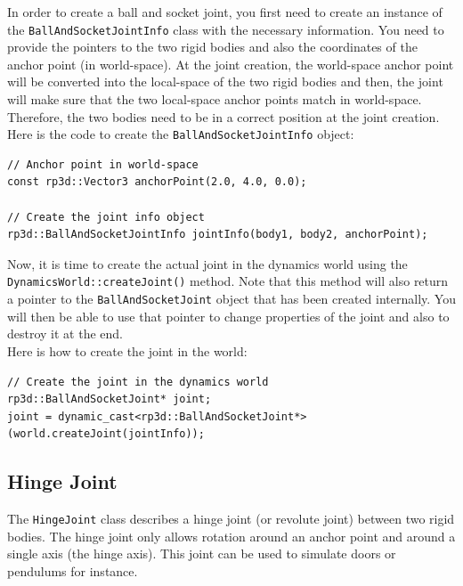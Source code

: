 \documentclass[a4paper,12pt]{article}
\begin{document}
    In order to create a ball and socket joint, you first need to create an instance of the \texttt{BallAndSocketJointInfo} class with the necessary information. You need to provide the pointers to the
    two rigid bodies and also the coordinates of the anchor point (in world-space). At the joint creation, the world-space anchor point will be converted into the local-space of the two rigid
    bodies and then, the joint will make sure that the two local-space anchor points match in world-space. Therefore, the two bodies need to be in a correct position at the joint creation. \\

    Here is the code to create the \texttt{BallAndSocketJointInfo} object: \\

    \begin{lstlisting}
// Anchor point in world-space
const rp3d::Vector3 anchorPoint(2.0, 4.0, 0.0);

// Create the joint info object
rp3d::BallAndSocketJointInfo jointInfo(body1, body2, anchorPoint);
  \end{lstlisting}

    \vspace{0.6cm}

    Now, it is time to create the actual joint in the dynamics world using the \texttt{DynamicsWorld::createJoint()} method.
    Note that this method will also return a pointer to the \texttt{BallAndSocketJoint} object that has been created internally. You will then
    be able to use that pointer to change properties of the joint and also to destroy it at the end. \\

    Here is how to create the joint in the world: \\

    \begin{lstlisting}
// Create the joint in the dynamics world
rp3d::BallAndSocketJoint* joint;
joint = dynamic_cast<rp3d::BallAndSocketJoint*>(world.createJoint(jointInfo));
  \end{lstlisting}

    \vspace{0.6cm}

    \subsection{Hinge Joint}

    The \texttt{HingeJoint} class describes a hinge joint (or revolute joint) between two rigid bodies. The hinge joint only allows rotation around an anchor point and
    around a single axis (the hinge axis). This joint can be used to simulate doors or pendulums for instance. \\
\end{document}

